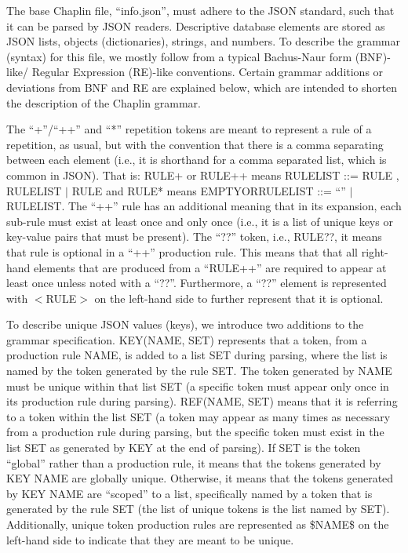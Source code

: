 \label{sec:grammar}

The base Chaplin
file, ``info.json'',
must adhere to the JSON standard, such that it can be parsed
by JSON readers.
Descriptive database elements are stored as 
JSON lists, objects (dictionaries), strings, and numbers.
To describe the grammar (syntax) for this file, we mostly follow 
from a typical Bachus-Naur form (BNF)-like/
Regular Expression (RE)-like conventions.
Certain grammar additions or deviations
from BNF and RE are explained below, which are intended
to shorten the description of the Chaplin grammar. 

The ``+''/``++'' and ``*'' repetition tokens are meant 
to represent a rule of a
repetition, as usual, but
with the convention that there is
a comma separating between each element
(i.e., it is shorthand for a comma
separated list, which is common in JSON). That is:
RULE+ or RULE++ means 
RULELIST ::= RULE , RULELIST $|$ RULE and
RULE* means EMPTYORRULELIST ::= ``'' $|$ RULELIST.
The ``++'' rule has an additional meaning that in its expansion,
each sub-rule must exist at least
once and only once (i.e., it is a list of unique
keys or key-value pairs that must be present).
The ``??'' token,  i.e., RULE??,
it means that rule is optional in a ``++'' production rule.
This means that that all right-hand elements that 
are produced from a ``RULE++'' are required to appear
at least once unless noted with a ``??''.
Furthermore, a ``??'' element is represented with $<$RULE$>$
on the left-hand side to further represent that it is optional.

To describe unique JSON values (keys), we introduce two
additions to the grammar specification.
KEY(NAME, SET) represents that a token, from a production
rule NAME, is added to a list SET during parsing,
where the list is named by the token generated by the rule SET.
The token generated by NAME must be
unique within that list SET (a specific token must appear only
once in its production
rule during parsing). REF(NAME, SET) means that
it is referring to a token within the list SET 
(a token may appear as many times as necessary
from a production rule during parsing,
but the specific token must exist in the list SET
as generated by KEY at the end of parsing).
If SET is the token ``global''
rather than a production rule, it means that the tokens generated
by KEY NAME are globally unique.  Otherwise,
it means that the tokens
generated by KEY NAME are ``scoped'' to a list, specifically
named by a token that is generated by the rule SET
(the list of unique tokens is the list named by SET).
Additionally, unique token production
rules are represented as \$NAME\$
on the left-hand side to indicate that they are meant to be unique.

